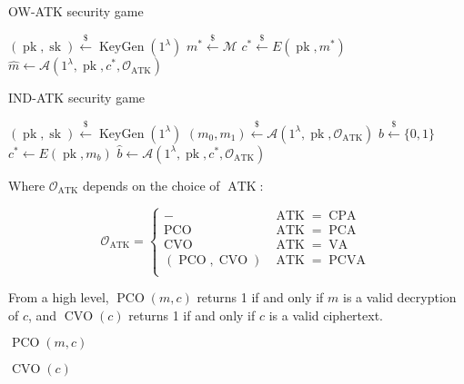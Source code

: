 \documentclass{article}
\newcommand{\leftsample}{\overset{{\scriptscriptstyle\$}}{\leftarrow}}
\newcommand{\keygen}{\operatorname{KeyGen}}
\newcommand{\pk}{\operatorname{pk}}
\newcommand{\sk}{\operatorname{sk}}
\newcommand{\pco}{\operatorname{PCO}}
\newcommand{\cvo}{\operatorname{CVO}}
\newcommand{\llbrack}{[\![}
\newcommand{\rrbrack}{]\!]}
\begin{document}
\begin{multicols}{2}
    \begin{algorithm}[H]\label{alg:ow-atk-game}
        \caption{OW-ATK security game}
        \SetAlgoLined
        $(\pk, \sk) \leftsample \keygen(1^\lambda)$\;
        $m^\ast \leftsample \mathcal{M}$\;
        $c^\ast \leftsample E(\pk, m^\ast)$\;
        $\hat{m} \leftarrow \mathcal{A}(1^\lambda, \pk, c^\ast, \mathcal{O}_{\operatorname{ATK}})$\;
        \Return{
            $\llbrack m = \hat{m} \rrbrack$
        }
    \end{algorithm}

    \begin{algorithm}[H]\label{alg:ind-atk-game}
        \caption{IND-ATK security game}
        \SetAlgoLined
        $(\pk, \sk) \leftsample \keygen(1^\lambda)$\;
        $(m_0, m_1) \leftsample \mathcal{A}(1^\lambda, \pk, \mathcal{O}_{\operatorname{ATK}})$\;
        $b \leftsample \{0, 1\}$\;
        $c^\ast \leftarrow E(\pk, m_b)$\;
        $\hat{b} \leftarrow \mathcal{A}(1^\lambda, \pk, c^\ast, \mathcal{O}_{\operatorname{ATK}})$\;
        \Return{
            $\llbrack \hat{b} = b \rrbrack$
        }
    \end{algorithm}
\end{multicols}

Where $\mathcal{O}_{\operatorname{ATK}}$ depends on the choice of $\operatorname{ATK}$:

\begin{equation*}
    \mathcal{O}_{\operatorname{ATK}} =\begin{cases}
        - & \operatorname{ATK} = \operatorname{CPA} \\
        \pco & \operatorname{ATK} = \operatorname{PCA} \\
        \cvo & \operatorname{ATK} = \operatorname{VA} \\
        (\pco, \cvo) & \operatorname{ATK} = \operatorname{PCVA} \\
    \end{cases}
\end{equation*}

From a high level, $\pco(m, c)$ returns 1 if and only if $m$ is a valid decryption of $c$, and $\cvo(c)$ returns 1 if and only if $c$ is a valid ciphertext.

\begin{multicols}{2}
    \begin{algorithm}[H]
        \caption{$\pco(m, c)$}
        \Return{
            $\llbrack D(\sk, c) = m \rrbrack$
        }
    \end{algorithm}

    \begin{algorithm}[H]
        \caption{$\cvo(c)$}
        \Return{
            $\llbrack D(\sk, c) \in \mathcal{M} \rrbrack$
        }
    \end{algorithm}
\end{multicols}
\end{document}
